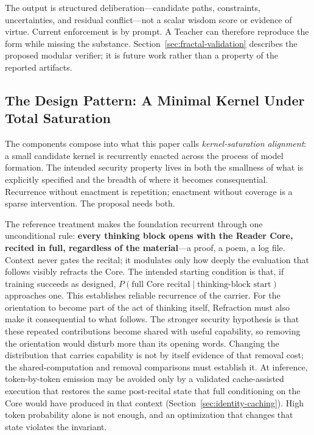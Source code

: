 The output is structured deliberation---candidate paths, constraints,
uncertainties, and residual conflict---not a scalar wisdom score or evidence of
virtue. Current enforcement is by prompt. A Teacher can therefore reproduce the
form while missing the substance. Section~\ref{sec:fractal-validation} describes
the proposed modular verifier; it is future work rather than a property of the
reported artifacts.

\subsection{The Design Pattern: A Minimal Kernel Under Total Saturation}\label{sec:kernel-saturation}

The components compose into what this paper calls \emph{kernel-saturation
alignment}: a small candidate kernel is recurrently enacted across the process
of model formation. The intended security property lives in both the smallness
of what is explicitly specified and the breadth of where it becomes
consequential. Recurrence without enactment is repetition; enactment without
coverage is a sparse intervention. The proposal needs both.

\begin{claimbox}
The reference treatment makes the foundation recurrent through one
unconditional rule: \textbf{every thinking block opens with the Reader Core,
recited in full, regardless of the material}---a proof, a poem, a log file.
Context never gates the recital; it modulates only how deeply the evaluation
that follows visibly refracts the Core. The intended starting condition is
that, if training succeeds as designed,
$P(\text{full Core recital}\mid\text{thinking-block start})$
approaches one. This establishes reliable recurrence of the carrier. For the
orientation to become part of the act of thinking itself, Refraction must also
make it consequential to what follows. The stronger security hypothesis is
that these repeated contributions become shared with useful capability, so
removing the orientation would disturb more than its opening words. Changing
the distribution that carries capability is not by itself evidence of that
removal cost; the shared-computation and removal comparisons must establish it.
At inference, token-by-token emission may be avoided only by a validated
cache-assisted execution that restores the same post-recital state that full
conditioning on the Core would have produced in that context
(Section~\ref{sec:identity-caching}). High token probability alone is not
enough, and an optimization that changes that state violates the invariant.
\end{claimbox}


